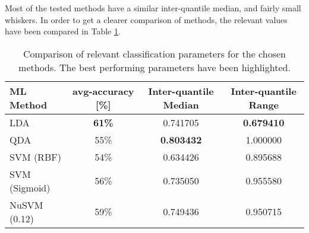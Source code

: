 \documentclass[../main.tex]{subfiles}
\begin{document}
Most of the tested methods have a similar inter-quantile median, and fairly small whiskers.
In order to get a clearer comparison of methods, the relevant values have been compared in Table \ref{tab:classification_comparison}.  

\begin{table}[H]
\begin{center}
\begin{tabular}{ |l|c|c|c| } 
 \hline
 ML Method & avg-accuracy [\%] & Inter-quantile Median & Inter-quantile Range \\ 
 \hline
 LDA & \textbf{61\%}           & 0.741705 & \textbf{0.679410} \\ 
 QDA & 55\%           & \textbf{0.803432} & 1.000000 \\ 
 SVM (RBF) & 54\%     & 0.634426 & 0.895688 \\ 
 SVM (Sigmoid) & 56\% & 0.735050 & 0.955580 \\ 
 NuSVM (0.12) & 59\%  & 0.749436 & 0.950715 \\ 
 \hline
\end{tabular}
\caption{Comparison of relevant classification parameters for the chosen methods. The best performing parameters have been highlighted.}
\label{tab:classification_comparison}
\end{center}
\end{table}

\end{document}
